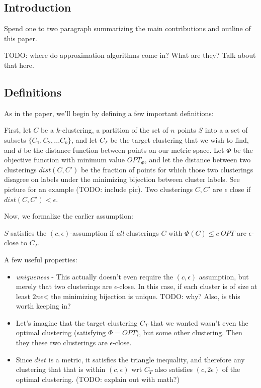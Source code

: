 \documentclass[paper=a4, fontsize=11pt]{scrartcl} %
\numberwithin{equation}{section} %
\numberwithin{figure}{section} %
\numberwithin{table}{section} %
\begin{document}
\subsection{Introduction}

Spend one to two paragraph summarizing the main contributions and outline of this paper.

TODO: where do approximation algorithms come in?  What are they?  Talk about that here.

\subsection{Definitions}
As in the paper, we'll begin by defining a few important definitions:

First, let $C$ be a $k$-clustering, a partition of the set of $n$ points $S$ into a a set of subsets $\{C_1, C_2, ...C_k\}$, and let $C_T$ be the target clustering that we wish to find, and $d$ be the distance function between points on our metric space.  Let $\Phi$ be the objective function with minimum value $OPT_{\Phi}$, and let the distance between two clusterings $dist(C, C')$ be the 
fraction of points for which those two clusterings disagree on labels under the minimizing bijection between cluster labels.  See picture for an example (TODO: include pic).  Two clusterings $C, C'$ are $\epsilon$ close if $dist(C, C') < \epsilon$.

Now, we formalize the earlier assumption:

$S$ satisfies the $(c, \epsilon)$-assumption if \emph{all} clusterings $C$ with $\Phi(C) \leq c~OPT$ are $\epsilon$-close to $C_T$.

A few useful properties:

\begin{itemize}

\item \emph{uniqueness} - This actually doesn't even require the $(c, \epsilon)$ assumption, but merely that two clusterings are $\epsilon$-close.  In this case, if each cluster is of size at least $2n\epsilon$< the minimizing bijection is unique. TODO: why?  Also, is this worth keeping in?

\item Let's imagine that the target clustering $C_T$ that we wanted wasn't even the optimal clustering (satisfying $\Phi = OPT$), but some other clustering.  Then they these two clusterings are $\epsilon$-close.

\item Since $dist$ is a metric, it satisfies the triangle inequality, and therefore any clustering that that is within $(c, \epsilon)$ wrt $C_T$ also satisfies $(c, 2\epsilon)$ of the optimal clustering. (TODO: explain out with math?)



\end{itemize}
\end{document}
